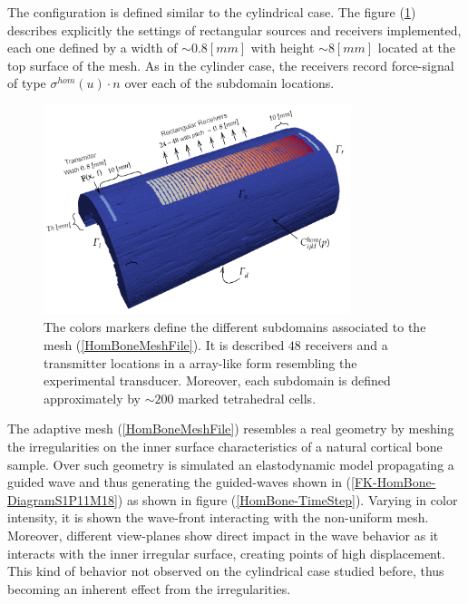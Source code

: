 The configuration is defined similar to the cylindrical case. The figure (\ref{HomBoneSubdomainsFile}) describes explicitly the settings of rectangular sources and receivers implemented, each one defined by a width of $\sim 0.8 [mm]$ with height $\sim 8 [mm]$ located at the top surface of the mesh. As in the cylinder case, the receivers record force-signal of type $\sigma^{hom}(u)\cdot n$ over each of the subdomain locations.
\begin{figure}[!h]
	\centering
	\includegraphics[width=0.8\textwidth]{images/ImgExt/Cortical3dsc04Mesh1000Fill-MeshBoundaries.png}
	\caption{The colors markers define the different subdomains associated to the mesh (\ref{HomBoneMeshFile}). It is described $48$ receivers and a transmitter locations in a array-like form resembling the experimental transducer. Moreover, each subdomain is defined approximately by $\sim 200$ marked tetrahedral cells.}
	\label{HomBoneSubdomainsFile}
\end{figure} 
The adaptive mesh (\ref{HomBoneMeshFile}) resembles a real geometry by meshing the irregularities on the inner surface characteristics of a natural cortical bone sample. Over such geometry is simulated an elastodynamic model propagating a guided wave and thus generating the guided-waves shown in (\ref{FK-HomBone-DiagramS1P11M18}) as shown in figure (\ref{HomBone-TimeStep}). Varying in color intensity, it is shown the wave-front interacting with the non-uniform mesh. Moreover, different view-planes show direct impact in the wave behavior as it interacts with the inner irregular surface, creating points of high displacement. This kind of behavior not observed on the cylindrical case studied before, thus becoming an inherent effect from the irregularities.

